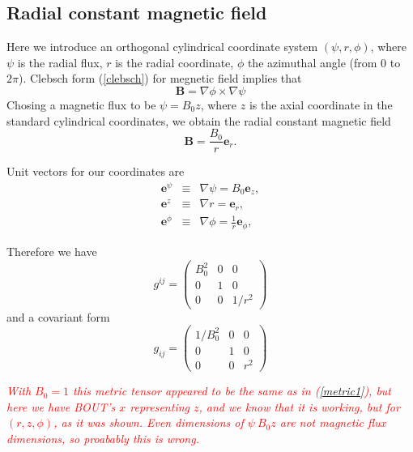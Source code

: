 \documentclass[11pt, oneside]{article}
\begin{document}
\subsection{Radial constant magnetic field}
Here we introduce an orthogonal cylindrical coordinate system $(\psi, r, \phi)$, where $\psi$ is the radial flux, $r$ is the radial coordinate, $\phi$ the azimuthal angle (from $0$ to $2 \pi$). Clebsch form (\ref{clebsch}) for megnetic field implies that
\begin{equation*}
\mathbf{B} =\nabla \phi \times \nabla \psi
\end{equation*}%
Chosing a magnetic flux to be $\psi = B_0 z$, where $z$ is the axial coordinate in the standard cylindrical coordinates, we obtain the radial constant magnetic field 
\begin{equation}
\mathbf{B} = \frac{B_0}{r} \mathbf{e}_r.
\end{equation}

Unit vectors for our coordinates are
\begin{eqnarray}
\mathbf{e}^{\psi} &\equiv& \nabla \psi = B_{0}\mathbf{e}_z, \\
\mathbf{e}^{z} &\equiv& \nabla r = \mathbf{e}_r, \\
\mathbf{e}^{\phi} &\equiv& \nabla \phi = \frac{1}{r}\mathbf{e}_{\phi},
\end{eqnarray}%

Therefore we have
\begin{equation*}
g^{ij}=\left(
\begin{array}{ccc}
B_{0}^{2} & 0 & 0 \\
0 & 1 & 0 \\
0 & 0 & 1/r^{2}%
\end{array}%
\right)
\end{equation*}%
and a covariant form
\begin{equation*}
g_{ij}=\left(
\begin{array}{ccc}
1/B_{0}^{2} & 0 & 0 \\
0 & 1 & 0 \\
0 & 0 & r^{2}%
\end{array}%
\right)
\end{equation*}

\textcolor{red}{\emph{With $B_0 = 1$ this metric tensor appeared to be the same as in (\ref{metric1}), but here we have BOUT's $x$ representing $z$, and we know that it is working, but for $(r,z,\phi)$, as it was shown. Even dimensions of $\psi ~ B_0 z$ are not magnetic flux dimensions, so proabably this is wrong.}}
\end{document}
